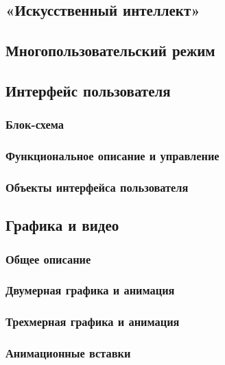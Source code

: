 \documentclass{article}
\begin{document}
\subsection{«Искусственный интеллект»}

\subsection{Многопользовательский режим}

\subsection{Интерфейс пользователя}

\subsubsection{Блок-схема}

\subsubsection{Функциональное описание и управление}

\subsubsection{Объекты интерфейса пользователя}

\subsection{Графика и видео}

\subsubsection{Общее описание}

\subsubsection{Двумерная графика и анимация}

\subsubsection{Трехмерная графика и анимация}

\subsubsection{Анимационные вставки}
\end{document}
